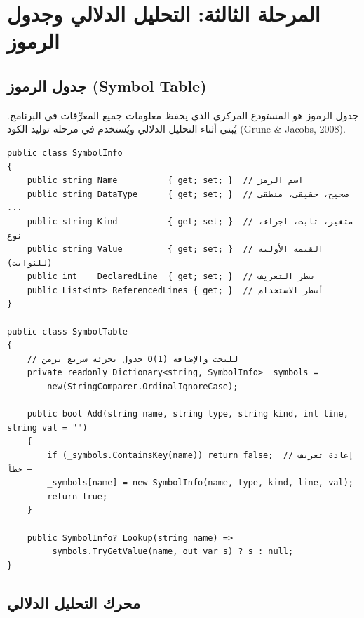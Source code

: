 \documentclass[12pt,a4paper]{report}
\newcommand{\filename}[1]{\textcolor{SecondaryBlue}{\texttt{#1}}}
\begin{document}
\chapter{المرحلة الثالثة: التحليل الدلالي وجدول الرموز}

\section{جدول الرموز (Symbol Table)}

جدول الرموز هو المستودع المركزي الذي يحفظ معلومات جميع المعرِّفات في البرنامج. يُبنى أثناء التحليل الدلالي ويُستخدم في مرحلة توليد الكود (Grune \& Jacobs, 2008).

\begin{CodeBox}[title={\filename{SymbolTable.cs} — هيكل جدول الرموز}]
\begin{lstlisting}[style=CSharpStyle]
public class SymbolInfo
{
    public string Name          { get; set; }  // اسم الرمز
    public string DataType      { get; set; }  // صحيح، حقيقي، منطقي ...
    public string Kind          { get; set; }  // متغير، ثابت، اجراء، نوع
    public string Value         { get; set; }  // القيمة الأولية (للثوابت)
    public int    DeclaredLine  { get; set; }  // سطر التعريف
    public List<int> ReferencedLines { get; }  // أسطر الاستخدام
}

public class SymbolTable
{
    // جدول تجزئة سريع بزمن O(1) للبحث والإضافة
    private readonly Dictionary<string, SymbolInfo> _symbols =
        new(StringComparer.OrdinalIgnoreCase);

    public bool Add(string name, string type, string kind, int line, string val = "")
    {
        if (_symbols.ContainsKey(name)) return false;  // إعادة تعريف — خطأ
        _symbols[name] = new SymbolInfo(name, type, kind, line, val);
        return true;
    }

    public SymbolInfo? Lookup(string name) =>
        _symbols.TryGetValue(name, out var s) ? s : null;
}
\end{lstlisting}
\end{CodeBox}

\section{محرك التحليل الدلالي}
\end{document}
